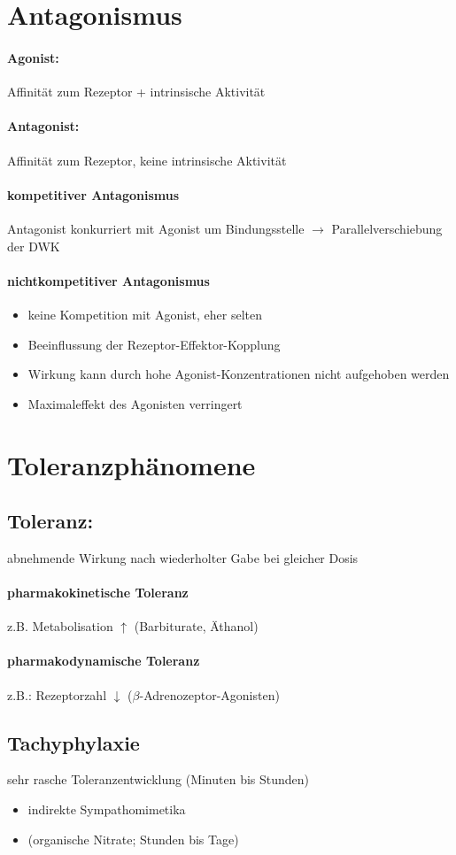 \documentclass[10pt,a4paper]{report}
\begin{document}
\section{Antagonismus}
\paragraph{Agonist:}Affinität zum Rezeptor
+ intrinsische Aktivität
\paragraph{Antagonist:} Affinität zum Rezeptor, 
keine intrinsische Aktivität
\paragraph{kompetitiver Antagonismus} Antagonist konkurriert mit Agonist um 
Bindungsstelle $\rightarrow$ Parallelverschiebung der DWK
\paragraph{nichtkompetitiver Antagonismus}
\begin{itemize}
	\item keine Kompetition mit Agonist, eher selten
	\item Beeinflussung der Rezeptor-Effektor-Kopplung
	\item Wirkung kann durch hohe Agonist-Konzentrationen nicht aufgehoben werden
	\item Maximaleffekt des Agonisten	verringert
\end{itemize}
\section{Toleranzphänomene}
\subsection{Toleranz:} abnehmende Wirkung nach wiederholter Gabe bei gleicher Dosis
\paragraph{pharmakokinetische Toleranz} z.B. Metabolisation $\uparrow$ (Barbiturate, Äthanol)
\paragraph{pharmakodynamische Toleranz} z.B.: Rezeptorzahl $\downarrow$ ($\beta$-Adrenozeptor-Agonisten)
\subsection{Tachyphylaxie}
sehr rasche Toleranzentwicklung (Minuten bis Stunden)
\begin{itemize}
	\item indirekte Sympathomimetika
	\item (organische Nitrate; Stunden bis Tage)
\end{itemize}
\end{document}
